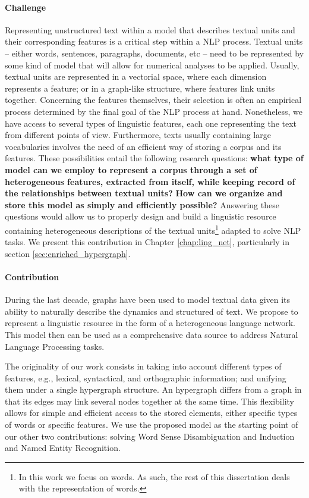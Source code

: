 \paragraph{Challenge}
Representing unstructured text within a model that describes textual units and their corresponding features is a critical step within a NLP process. Textual units -- either words, sentences, paragraphs, documents, etc -- need to be represented by some kind of model that will allow for numerical analyses to be applied. Usually, textual units are represented in a vectorial space, where each dimension represents a feature; or in a graph-like structure, where features link units together. Concerning the features themselves, their selection is often an empirical process determined  by the final goal of the NLP process at hand. Nonetheless,  we have access to several types of linguistic features, each one representing the text from different points of view.  Furthermore, texts usually containing large vocabularies involves the need of an efficient way of storing a corpus and its features. These possibilities entail the following research questions: \textbf{what type of model can we employ to represent a corpus through a set of heterogeneous features, extracted from itself, while keeping record of the relationships between textual units?} \textbf{How can we organize and store this model as simply and efficiently possible?} Answering these questions would allow us to  properly design and build a linguistic resource containing heterogeneous descriptions of the textual units\footnote{In this work we focus on words. As such, the rest of this dissertation deals with the representation of words.} adapted to solve NLP tasks. We present this contribution in Chapter \ref{chap:ling_net}, particularly in section \ref{sec:enriched_hypergraph}.


\paragraph{Contribution}

During the last decade, graphs have been used to model textual data given its ability to naturally describe the dynamics and structured of text. We propose to represent a linguistic resource in the form of a heterogeneous language network. This model then can be used as a comprehensive data source to address Natural Language Processing tasks. 

The originality of our work consists in taking into account different types of features, e.g., lexical, syntactical, and orthographic information; and unifying them under a single hypergraph structure. An hypergraph differs from a graph in that its edges may link several nodes together at the same time. This flexibility allows for simple and efficient access to the stored elements, either specific types of words or specific features.
%
We use the proposed model as the starting point of our other two contributions: solving Word Sense Disambiguation and Induction and Named Entity Recognition. 

